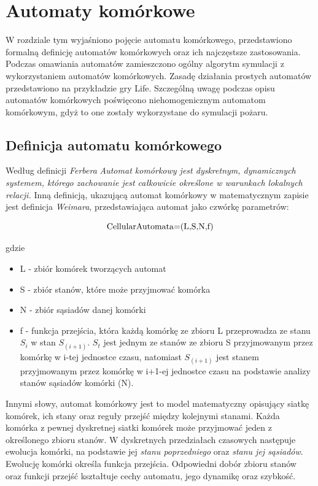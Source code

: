 ﻿%
\chapter{Automaty komórkowe}
\label{cha:Automaty komórkowe}
W rozdziale tym wyjaśniono pojęcie automatu komórkowego, przedstawiono formalną definicję automatów komórkowych oraz ich najczęstsze zastosowania. Podczas omawiania automatów zamieszczono ogólny algorytm symulacji z wykorzystaniem automatów komórkowych. Zasadę działania prostych automatów przedstawiono
na przykładzie gry Life. Szczególną uwagę podczas opisu 
 automatów komórkowych poświęcono niehomogenicznym automatom komórkowym, gdyż to one zostały wykorzystane
do symulacji pożaru. 
\section {Definicja automatu komórkowego}
Według definicji \textit {Ferbera} \textsl{ Automat komórkowy jest dyskretnym, dynamicznych systemem, którego zachowanie jest
całkowicie określone w warunkach lokalnych relacji.}
Inną definicją, ukazującą automat komórkowy w matematycznym zapisie jest definicja \textit{Weimara}, przedstawiająca
automat jako czwórkę parametrów:
\begin{Center}
\begin {equation}
\label{def_automatu}
$CellularAutomata=(L,S,N,f)$
\end {equation}
\end{Center}
gdzie
\begin{itemize}
\item L - zbiór komórek tworzących automat
\item S - zbiór stanów, które może przyjmować komórka
\item N - zbiór sąsiadów danej komórki
\item f - funkcja przejścia, która każdą komórkę ze zbioru L przeprowadza  ze stanu $S_i$ w stan $S_(i+1)$. $S_t$ jest jednym ze stanów
		ze zbioru S przyjmowanym przez komórkę w i-tej jednostce czasu, natomiast $S_(i+1)$ jest stanem przyjmowanym
		przez komórkę w i+1-ej jednostce czasu na podstawie analizy stanów sąsiadów komórki (N).
\end{itemize}
Innymi słowy, automat komórkowy jest to model matematyczny opisujący siatkę komórek, ich stany oraz reguły przejść
między kolejnymi stanami. Każda komórka z pewnej dyskretnej siatki komórek może przyjmować jeden z określonego zbioru stanów.
W dyskretnych przedziałach czasowych następuje ewolucja komórki, na podstawie jej \textit{stanu poprzedniego} oraz \textit{stanu jej sąsiadów}. Ewolucję komórki określa funkcja przejścia. Odpowiedni dobór zbioru stanów oraz funkcji przejść kształtuje cechy automatu, jego dynamikę oraz szybkość.
